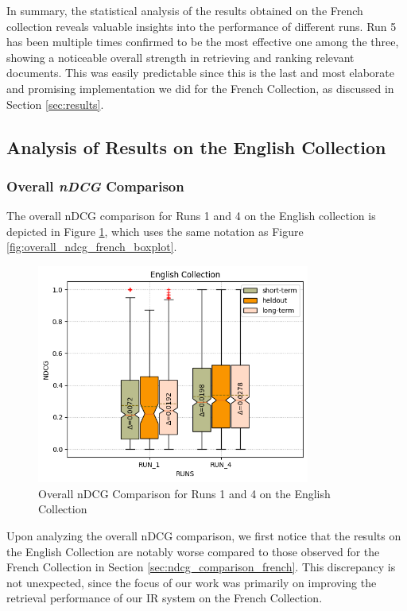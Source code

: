 In summary, the statistical analysis of the results obtained on the French collection reveals valuable insights into the performance of different runs. 
Run 5 has been multiple times confirmed to be the most effective one among the three, showing a noticeable overall strength in retrieving and ranking relevant documents.
This was easily predictable since this is the last and most elaborate and promising implementation we did for the French Collection, as discussed in Section \ref{sec:results}.   


\newpage
\enlargethispage{8\baselineskip}
\subsection{Analysis of Results on the English Collection}

\subsubsection{Overall \textit{nDCG} Comparison} \label{sec:ndcg_comparison_eng}

The overall \ac{nDCG} comparison for Runs 1 and 4 on the English collection is depicted in Figure \ref{fig:overall_ndcg_eng}, which uses the same notation as Figure \ref{fig:overall_ndcg_french_boxplot}.

\begin{figure}[!h]
\centering
\includegraphics[width=0.8\textwidth]{figure/StatisticalAnalysis/BoxPlot/NDGC ENGLISH.png}
\caption{Overall nDCG Comparison for Runs 1 and 4 on the English Collection}
\label{fig:overall_ndcg_eng}
\end{figure}
 
Upon analyzing the overall \ac{nDCG} comparison, we first notice that the results on the English Collection are notably worse compared to those observed for the French Collection in Section \ref{sec:ndcg_comparison_french}. 
This discrepancy is not unexpected, since the focus of our work was primarily on improving the retrieval performance of our \ac{IR} system on the French Collection.

